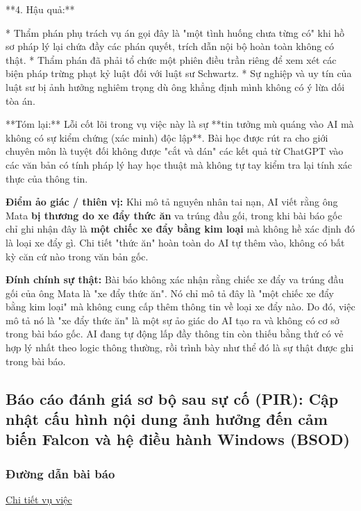 **4. Hậu quả:**

* Thẩm phán phụ trách vụ án gọi đây là "một tình huống chưa từng có" khi hồ sơ pháp lý lại chứa đầy các phán quyết, trích dẫn nội bộ hoàn toàn không có thật.
* Thẩm phán đã phải tổ chức một phiên điều trần riêng để xem xét các biện pháp trừng phạt kỷ luật đối với luật sư Schwartz.
* Sự nghiệp và uy tín của luật sư bị ảnh hưởng nghiêm trọng dù ông khẳng định mình không có ý lừa dối tòa án.

**Tóm lại:** Lỗi cốt lõi trong vụ việc này là sự **tin tưởng mù quáng vào AI mà không có sự kiểm chứng (xác minh) độc lập**. Bài học được rút ra cho giới chuyên môn là tuyệt đối không được "cắt và dán" các kết quả từ ChatGPT vào các văn bản có tính pháp lý hay học thuật mà không tự tay kiểm tra lại tính xác thực của thông tin.

\textbf{Điểm ảo giác / thiên vị:}
Khi mô tả nguyên nhân tai nạn, AI viết rằng ông Mata \textbf{bị thương do xe đẩy thức ăn} va trúng đầu gối, trong khi bài báo gốc chỉ ghi nhận đây là \textbf{một chiếc xe đẩy bằng kim loại} mà không hề xác định đó là loại xe đẩy gì. Chi tiết "thức ăn" hoàn toàn do AI tự thêm vào, không có bất kỳ căn cứ nào trong văn bản gốc.

\textbf{Đính chính sự thật:}
Bài báo không xác nhận rằng chiếc xe đẩy va trúng đầu gối của ông Mata là "xe đẩy thức ăn". Nó chỉ mô tả đây là "một chiếc xe đẩy bằng kim loại" mà không cung cấp thêm thông tin về loại xe đẩy nào. Do đó, việc mô tả nó là "xe đẩy thức ăn" là một sự ảo giác do AI tạo ra và không có cơ sở trong bài báo gốc. AI đang tự động lấp đầy thông tin còn thiếu bằng thứ có vẻ hợp lý nhất theo logic thông thường, rồi trình bày như thể đó là sự thật được ghi trong bài báo.

\subsection{Báo cáo đánh giá sơ bộ sau sự cố (PIR): Cập nhật cấu hình nội dung ảnh hưởng đến cảm biến Falcon và hệ điều hành Windows (BSOD)}

\subsubsection{Đường dẫn bài báo}
\href{https://www.crowdstrike.com/en-us/blog/falcon-content-update-preliminary-post-incident-report/}{Chi tiết vụ việc}

